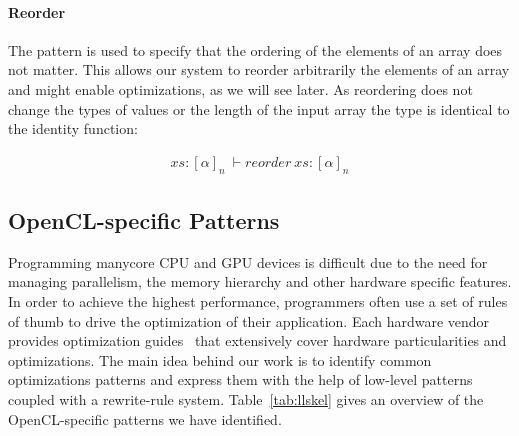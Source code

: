 \paragraph{Reorder}
The  pattern is used to specify that the ordering of the elements of an array does not matter.
This allows our system to reorder arbitrarily the elements of an array and might enable optimizations, as we will see later.
As reordering does not change the types of values or the length of the input array the type is identical to the identity function:

\begin{align}
  xs : [\alpha]_n\ \vdash reorder\ xs : [\alpha]_n
\end{align}








\subsection{OpenCL-specific Patterns}

Programming manycore CPU and GPU devices is difficult due to the need for managing parallelism, the memory hierarchy and other hardware specific features.
In order to achieve the highest performance, programmers often use a set of rules of thumb to drive the optimization of their application.
Each hardware vendor provides optimization guides~\cite{nvidia11guide,amd12guide} that extensively cover hardware particularities and optimizations.
The main idea behind our work is to identify common optimizations patterns and express them with the help of low-level patterns coupled with a rewrite-rule system.
%
Table~\ref{tab:llskel} gives an overview of the OpenCL-specific patterns we have identified.

